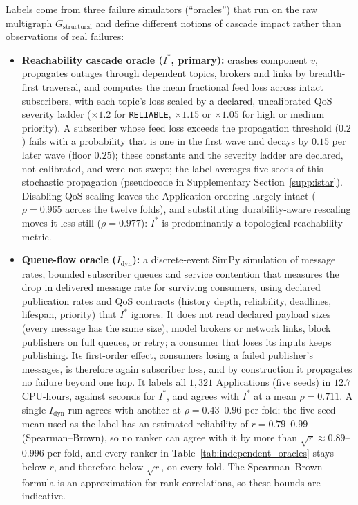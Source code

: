 \documentclass[preprint,3p]{elsarticle}
\providecommand{\tightlist}{%
  \setlength{\itemsep}{0pt}\setlength{\parskip}{0pt}}
\begin{document}
Labels come from three failure simulators (``oracles'') that run on the raw multigraph $G_{\text{structural}}$ and define different notions of cascade impact rather than observations of real failures:
\begin{itemize}\tightlist
    \item \textbf{Reachability cascade oracle ($I^*$, primary):} crashes component $v$, propagates outages through dependent topics, brokers and links by breadth-first traversal, and computes the mean fractional feed loss across intact subscribers, with each topic's loss scaled by a declared, uncalibrated QoS severity ladder ($\times 1.2$ for \texttt{RELIABLE}, $\times 1.15$ or $\times 1.05$ for high or medium priority). A subscriber whose feed loss exceeds the propagation threshold ($0.2$) fails with a probability that is one in the first wave and decays by $0.15$ per later wave (floor $0.25$); these constants and the severity ladder are declared, not calibrated, and were not swept; the label averages five seeds of this stochastic propagation (pseudocode in Supplementary Section~\ref{supp:istar}). Disabling QoS scaling leaves the Application ordering largely intact ($\rho = 0.965$ across the twelve folds), and substituting durability-aware rescaling moves it less still ($\rho = 0.977$): $I^*$ is predominantly a topological reachability metric.
    \item \textbf{Queue-flow oracle ($I_{\text{dyn}}$):} a discrete-event SimPy \cite{team2020simpy} simulation of message rates, bounded subscriber queues and service contention that measures the drop in delivered message rate for surviving consumers, using declared publication rates and QoS contracts (history depth, reliability, deadlines, lifespan, priority) that $I^*$ ignores. It does not read declared payload sizes (every message has the same size), model brokers or network links, block publishers on full queues, or retry; a consumer that loses its inputs keeps publishing. Its first-order effect, consumers losing a failed publisher's messages, is therefore again subscriber loss, and by construction it propagates no failure beyond one hop. It labels all $1{,}321$ Applications (five seeds) in $12.7$ CPU-hours, against seconds for $I^*$, and agrees with $I^*$ at a mean $\rho = 0.711$. A single $I_{\text{dyn}}$ run agrees with another at $\rho = 0.43$--$0.96$ per fold; the five-seed mean used as the label has an estimated reliability of $r = 0.79$--$0.99$ (Spearman--Brown), so no ranker can agree with it by more than $\sqrt{r} \approx 0.89$--$0.996$ per fold, and every ranker in Table~\ref{tab:independent_oracles} stays below $r$, and therefore below $\sqrt{r}$, on every fold. The Spearman--Brown formula is an approximation for rank correlations, so these bounds are indicative.

\end{itemize}
\end{document}
